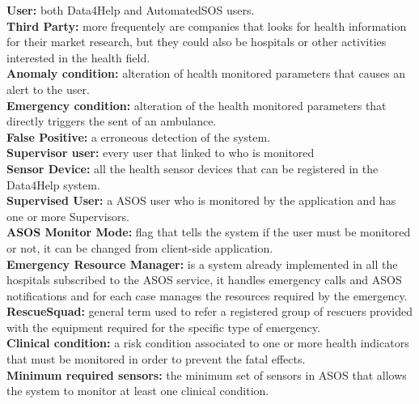 \begin{flushleft}
{}
{}
\raggedright
\textbf{User:} both Data4Help and AutomatedSOS users.\\
\textbf{Third Party:} more frequentely are companies that looks for health information for their market research, but they could also be hospitals or other activities interested in the health field.  \\ 
\textbf{Anomaly condition:} alteration of health monitored parameters that causes an alert to the user.\\
\textbf{Emergency condition:} alteration of the health monitored parameters that directly triggers the sent of an ambulance.\\
\textbf{False Positive:} a erroneous detection of the system.\\
\textbf{Supervisor user:} every user that linked to who is monitored \\
\textbf{Sensor Device:} all the health sensor devices that can be registered in the Data4Help system.\\
\textbf{Supervised User:} a ASOS user who is monitored by the application and has one or more Supervisors. \\
\textbf{ASOS Monitor Mode:} flag that tells the system if the user must be monitored or not, it can be changed from client-side application.\\
\textbf{Emergency Resource Manager:} is a system already implemented in all the hospitals subscribed to the ASOS service, it handles emergency calls and ASOS notifications and for each case manages the resources required by the emergency. \\
\textbf{RescueSquad:} general term used to refer a registered group of rescuers provided with the equipment required for the specific type of emergency. \\
\textbf{Clinical condition:} a risk condition associated to one or more health indicators that must be monitored in order to prevent the fatal effects. \\
\textbf{Minimum required sensors:} the minimum set of sensors in ASOS that allows the system to monitor at least one clinical condition. \\


\end{flushleft}
